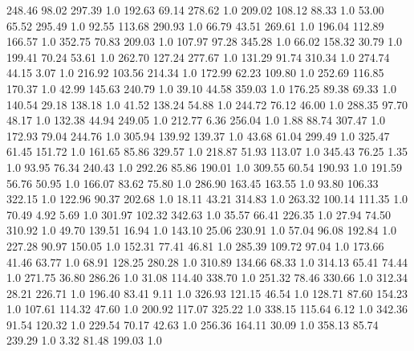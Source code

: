     248.46     98.02    297.39  1.0
    192.63     69.14    278.62  1.0
    209.02    108.12     88.33  1.0
     53.00     65.52    295.49  1.0
     92.55    113.68    290.93  1.0
     66.79     43.51    269.61  1.0
    196.04    112.89    166.57  1.0
    352.75     70.83    209.03  1.0
    107.97     97.28    345.28  1.0
     66.02    158.32     30.79  1.0
    199.41     70.24     53.61  1.0
    262.70    127.24    277.67  1.0
    131.29     91.74    310.34  1.0
    274.74     44.15      3.07  1.0
    216.92    103.56    214.34  1.0
    172.99     62.23    109.80  1.0
    252.69    116.85    170.37  1.0
     42.99    145.63    240.79  1.0
     39.10     44.58    359.03  1.0
    176.25     89.38     69.33  1.0
    140.54     29.18    138.18  1.0
     41.52    138.24     54.88  1.0
    244.72     76.12     46.00  1.0
    288.35     97.70     48.17  1.0
    132.38     44.94    249.05  1.0
    212.77      6.36    256.04  1.0
      1.88     88.74    307.47  1.0
    172.93     79.04    244.76  1.0
    305.94    139.92    139.37  1.0
     43.68     61.04    299.49  1.0
    325.47     61.45    151.72  1.0
    161.65     85.86    329.57  1.0
    218.87     51.93    113.07  1.0
    345.43     76.25      1.35  1.0
     93.95     76.34    240.43  1.0
    292.26     85.86    190.01  1.0
    309.55     60.54    190.93  1.0
    191.59     56.76     50.95  1.0
    166.07     83.62     75.80  1.0
    286.90    163.45    163.55  1.0
     93.80    106.33    322.15  1.0
    122.96     90.37    202.68  1.0
     18.11     43.21    314.83  1.0
    263.32    100.14    111.35  1.0
     70.49      4.92      5.69  1.0
    301.97    102.32    342.63  1.0
     35.57     66.41    226.35  1.0
     27.94     74.50    310.92  1.0
     49.70    139.51     16.94  1.0
    143.10     25.06    230.91  1.0
     57.04     96.08    192.84  1.0
    227.28     90.97    150.05  1.0
    152.31     77.41     46.81  1.0
    285.39    109.72     97.04  1.0
    173.66     41.46     63.77  1.0
     68.91    128.25    280.28  1.0
    310.89    134.66     68.33  1.0
    314.13     65.41     74.44  1.0
    271.75     36.80    286.26  1.0
     31.08    114.40    338.70  1.0
    251.32     78.46    330.66  1.0
    312.34     28.21    226.71  1.0
    196.40     83.41      9.11  1.0
    326.93    121.15     46.54  1.0
    128.71     87.60    154.23  1.0
    107.61    114.32     47.60  1.0
    200.92    117.07    325.22  1.0
    338.15    115.64      6.12  1.0
    342.36     91.54    120.32  1.0
    229.54     70.17     42.63  1.0
    256.36    164.11     30.09  1.0
    358.13     85.74    239.29  1.0
      3.32     81.48    199.03  1.0
